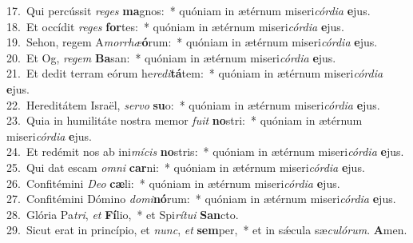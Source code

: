 {17.~}Qui percússit \textit{re}\textit{ges} \textbf{ma}gnos:~* quóniam in ætérnum miseri\textit{cór}\textit{di}\textit{a} \textbf{e}jus.\\
{18.~}Et occídit \textit{re}\textit{ges} \textbf{for}tes:~* quóniam in ætérnum miseri\textit{cór}\textit{di}\textit{a} \textbf{e}jus.\\
{19.~}Sehon, regem A\textit{mor}\textit{rhæ}\textbf{ó}rum:~* quóniam in ætérnum miseri\textit{cór}\textit{di}\textit{a} \textbf{e}jus.\\
{20.~}Et Og, \textit{re}\textit{gem} \textbf{Ba}san:~* quóniam in ætérnum miseri\textit{cór}\textit{di}\textit{a} \textbf{e}jus.\\
{21.~}Et dedit terram eórum he\textit{re}\textit{di}\textbf{tá}tem:~* quóniam in ætérnum miseri\textit{cór}\textit{di}\textit{a} \textbf{e}jus.\\
{22.~}Hereditátem Israël, \textit{ser}\textit{vo} \textbf{su}o:~* quóniam in ætérnum miseri\textit{cór}\textit{di}\textit{a} \textbf{e}jus.\\
{23.~}Quia in humilitáte nostra memor \textit{fu}\textit{it} \textbf{no}stri:~* quóniam in ætérnum miseri\textit{cór}\textit{di}\textit{a} \textbf{e}jus.\\
{24.~}Et redémit nos ab ini\textit{mí}\textit{cis} \textbf{no}stris:~* quóniam in ætérnum miseri\textit{cór}\textit{di}\textit{a} \textbf{e}jus.\\
{25.~}Qui dat escam \textit{om}\textit{ni} \textbf{car}ni:~* quóniam in ætérnum miseri\textit{cór}\textit{di}\textit{a} \textbf{e}jus.\\
{26.~}Confitémini \textit{De}\textit{o} \textbf{cæ}li:~* quóniam in ætérnum miseri\textit{cór}\textit{di}\textit{a} \textbf{e}jus.\\
{27.~}Confitémini Dómino \textit{do}\textit{mi}\textbf{nó}rum:~* quóniam in ætérnum miseri\textit{cór}\textit{di}\textit{a} \textbf{e}jus.\\
{28.~}Glória Pa\textit{tri}, \textit{et} \textbf{Fí}lio,~* et Spi\textit{rí}\textit{tu}\textit{i} \textbf{San}cto.\\
{29.~}Sicut erat in princípio, et \textit{nunc}, \textit{et} \textbf{sem}per,~* et in sǽcula sæ\textit{cu}\textit{ló}\textit{rum}. \textbf{A}men.\\

